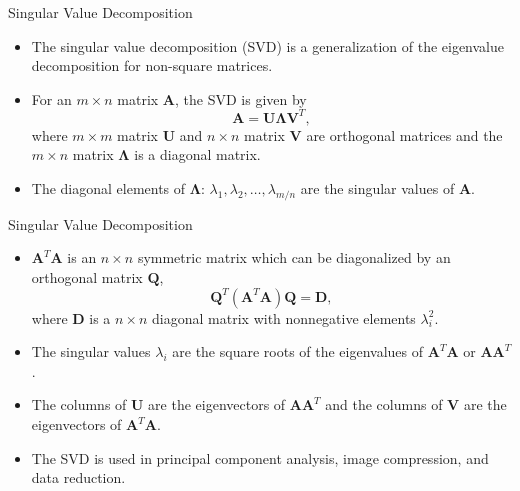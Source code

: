 \documentclass{beamer}
\begin{document}
\begin{frame}{Singular Value Decomposition}
    \begin{itemize}
        \item The singular value decomposition (SVD) is a generalization of the eigenvalue decomposition for non-square matrices.
        \item For an $m\times n$ matrix $\mathbf{A}$, the SVD is given by
        \[
        \mathbf{A}=\mathbf{U} \boldsymbol{\Lambda} \mathbf{V}^T,
        \] where  $m\times m$ matrix $\mathbf{U}$ and $n\times n$ matrix $\mathbf{V} $ are orthogonal matrices 
        and the $m\times n$ matrix $\boldsymbol{\Lambda}$ is a diagonal matrix.
        \item The diagonal elements of $\boldsymbol{\Lambda}$: $\lambda_1, \lambda_2, \ldots, \lambda_{m/n}$ are the singular values of $\mathbf{A}$.
        
    \end{itemize}
\end{frame}
\begin{frame}{Singular Value Decomposition}
    \begin{itemize}
        \item $\mathbf{A}^T \mathbf{A}$ is an $n\times n$ symmetric matrix which can be diagonalized
        by an orthogonal matrix $\mathbf{Q}$, 
        \[
        \mathbf{Q}^T \left(\mathbf{A}^T \mathbf{A} \right)\mathbf{Q}=\mathbf{D},
        \]
        where $\mathbf{D}$ is a $n\times n$ diagonal matrix with nonnegative elements $\lambda_i^2$.
        \item The singular values $\lambda_i$ are the square roots of the eigenvalues of $\mathbf{A}^T \mathbf{A}$ or $\mathbf{A} \mathbf{A}^T$.
        \item The columns of $\mathbf{U}$ are the eigenvectors of $\mathbf{A} \mathbf{A}^T$ and the columns of $\mathbf{V}$ are the eigenvectors of $\mathbf{A}^T \mathbf{A}$.
        \item The SVD is used in principal component analysis, image compression, and data reduction.
    \end{itemize}
\end{frame}
\end{document}
